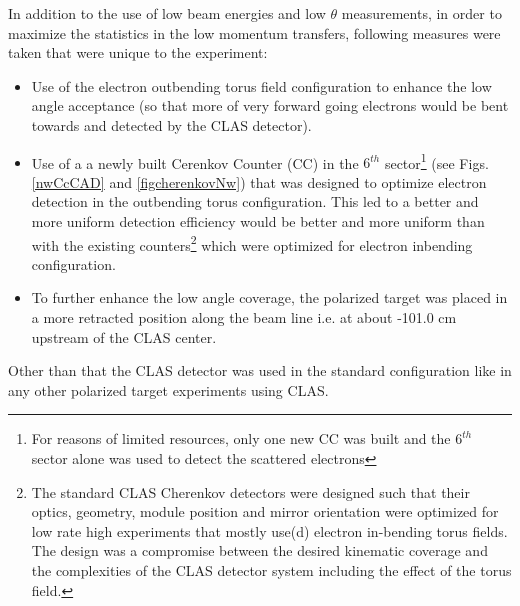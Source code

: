 In addition to the use of low beam energies and low $\theta$ measurements, in order to maximize the statistics in the low momentum transfers, following measures were taken that were unique to the experiment:
\begin{itemize}
\item Use of the electron outbending torus field configuration to enhance the low angle acceptance (so that more of very forward going electrons would be bent towards and detected by the CLAS detector).
\item Use of a a newly built Cerenkov Counter (CC) in the $6^{th}$ sector\footnote{For reasons of limited resources, only one new CC was built and the $6^{th}$ sector alone was used to detect the scattered electrons} (see Figs. \ref{nwCcCAD} and \ref{figcherenkovNw}) that was designed to optimize electron detection in the outbending torus configuration. %
This led to a better and more uniform %
  detection efficiency would be better and more uniform than with the existing counters\footnote{The standard CLAS Cherenkov detectors were designed such that their optics, geometry, module position and mirror orientation were optimized for low rate high \qsq experiments that mostly use(d) electron in-bending torus fields. The design was a compromise between the desired kinematic coverage and the complexities of the CLAS detector system including the effect of the torus field.} which were optimized for electron inbending configuration. 
\item To further enhance the low angle coverage, the polarized target was placed in a more retracted position along the beam line i.e. at about -101.0 cm upstream of the CLAS center.
\end{itemize}

Other than that the CLAS detector was used in the standard configuration like in any other polarized target experiments using CLAS.


